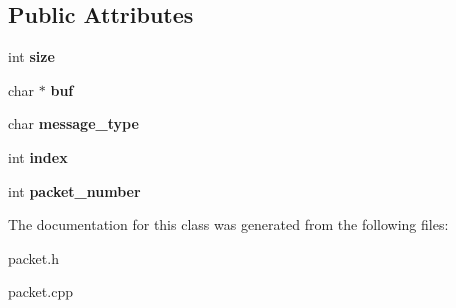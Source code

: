 \subsection*{Public Attributes}
\begin{DoxyCompactItemize}
\item 
\hypertarget{class_read_packet_afc99f7f5987ddc435d8bea3cad22183a}{int {\bfseries size}}\label{class_read_packet_afc99f7f5987ddc435d8bea3cad22183a}

\item 
\hypertarget{class_read_packet_a3547d75436b725e96ac698be40756af2}{char $\ast$ {\bfseries buf}}\label{class_read_packet_a3547d75436b725e96ac698be40756af2}

\item 
\hypertarget{class_read_packet_a0e5874d215ddcb1c9ece48229f4bca22}{char {\bfseries message\-\_\-type}}\label{class_read_packet_a0e5874d215ddcb1c9ece48229f4bca22}

\item 
\hypertarget{class_read_packet_acbe782b102a78ad0238daa933306f3b5}{int {\bfseries index}}\label{class_read_packet_acbe782b102a78ad0238daa933306f3b5}

\item 
\hypertarget{class_read_packet_a548c347871c323ffae1cc037e5923f72}{int {\bfseries packet\-\_\-number}}\label{class_read_packet_a548c347871c323ffae1cc037e5923f72}

\end{DoxyCompactItemize}


The documentation for this class was generated from the following files\-:\begin{DoxyCompactItemize}
\item 
packet.\-h\item 
packet.\-cpp\end{DoxyCompactItemize}
